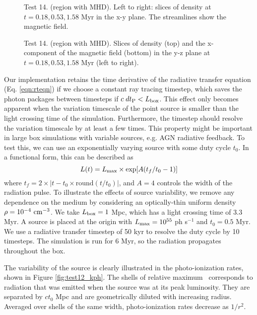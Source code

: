 \documentclass[useAMS,usenatbib,a4paper]{mn2e}
\begin{document}
\begin{figure*}
  \caption{\label{fig:test14_1} Test 14. (\hii region with MHD).
    Left to right: slices of density at $t = 0.18, 0.53, 1.58$ Myr in
    the x-y plane.  The streamlines show the magnetic field.}
\end{figure*}

\begin{figure*}
  \caption{\label{fig:test14_2} Test 14. (\hii region with
    MHD). Slices of density (top) and the x-component of the magnetic
    field (bottom) in the y-z plane at $t = 0.18, 0.53, 1.58$ Myr
    (left to right).}
\end{figure*}

Our implementation retains the time derivative of the radiative
transfer equation (Eq. \ref{eqn:rteqn}) if we choose a constant ray
tracing timestep, which saves the photon packages between timesteps if
$c\;dt_{\rm P} < L_{\rm box}$.  This effect only becomes apparent when
the variation timescale of the point source is smaller than the light
crossing time of the simulation.  Furthermore, the timestep should
resolve the variation timescale by at least a few times.  This
property might be important in large box simulations with variable
sources, e.g. AGN radiative feedback.  To test this, we can use an
exponentially varying source with some duty cycle $t_0$.  In a
functional form, this can be described as
%
\begin{equation}
  \label{eqn:test12}
  L(t) = L_{\rm max} \times \exp[A(t_f/t_0 - 1)]
\end{equation}
%
where $t_f = 2 \times |t - t_0 \times \mathrm{round}(t/t_0)|$, and
$A=4$ controls the width of the radiation pulse.  To illustrate the
effects of source variability, we remove any dependence on the medium
by considering an optically-thin uniform density $\rho =
10^{-4}~\cubecm$.  We take $L_{\rm box} = 1$ Mpc, which has a light
crossing time of 3.3 Myr.  A source is placed at the origin with
$L_{\rm max} = 10^{55}$ ph s$^{-1}$ and $t_0 = 0.5$ Myr.  We use a
radiative transfer timestep of 50 kyr to resolve the duty cycle by 10
timesteps.  The simulation is run for 6 Myr, so the radiation
propagates throughout the box.

The variability of the source is clearly illustrated in the
photo-ionization rates, shown in Figure \ref{fig:test12_kph}.  The
shells of relative maximum \kph~corresponds to radiation that was
emitted when the source was at its peak luminosity.  They are
separated by $ct_0$ Mpc and are geometrically diluted with increasing
radius.  Averaged over shells of the same width, photo-ionization
rates decrease as $1/r^2$.
\end{document}
